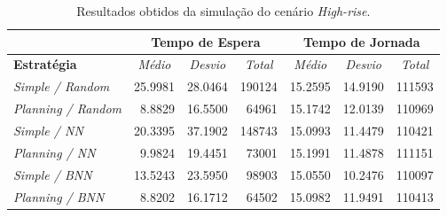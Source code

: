 \begin{table}[htb!]
\centering
\caption{Resultados obtidos da simulação do cenário \textit{High-rise}.}
\label{tab:results:highrise}
\begin{tabular}{|l|r|r|r|r|r|r|}
\hline
\multicolumn{1}{|c|}{\textbf{}}                 & \multicolumn{3}{c|}{\textbf{Tempo de Espera}}                                                                    & \multicolumn{3}{c|}{\textbf{Tempo de Jornada}}                                                                                                                       \\ \hline
\textbf{Estratégia} & \multicolumn{1}{c|}{\textit{Médio}} & \multicolumn{1}{c|}{\textit{Desvio}} & \multicolumn{1}{c|}{\textit{Total}} & \multicolumn{1}{c|}{\textit{Médio}}                   & \multicolumn{1}{c|}{\textit{Desvio}}                  & \multicolumn{1}{c|}{\textit{Total}}                  \\ \hline
\textit{Simple / Random}          & 25.9981                         & 28.0464                         & 190124                          & \cellcolor[HTML]{FD6864}15.2595 & 14.9190                         & \cellcolor[HTML]{FD6864}111593  \\ \hline
\textit{Planning / Random}        &  8.8829                         & 16.5500                         &  64961                          & 15.1742                         & 12.0139                         & 110969                          \\ \hline
\textit{Simple / NN}              & 20.3395                         & 37.1902                         & 148743                          & 15.0993                         & 11.4479                         & 110421                          \\ \hline
\textit{Planning / NN}            &  9.9824                         & 19.4451                         &  73001                          & 15.1991                         & 11.4878                         & 111151                          \\ \hline
\textit{Simple / BNN}             & 13.5243                         & 23.5950                         &  98903                          & 15.0550                         & \cellcolor[HTML]{67FD9A}10.2476 & 110097                          \\ \hline
\textit{Planning / BNN}           & \cellcolor[HTML]{67FD9A}8.8202  & \cellcolor[HTML]{67FD9A}16.1712 & \cellcolor[HTML]{67FD9A} 64502  & 15.0982                         & 11.9491                         & 110413                          \\ \hline

\end{tabular}
\end{table}
